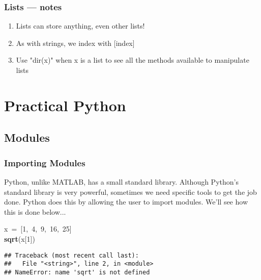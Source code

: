 \documentclass{beamer}\usepackage[]{graphicx}\usepackage[]{color}
\makeatletter
\newcommand{\hlnum}[1]{\textcolor[rgb]{0.686,0.059,0.569}{#1}}%
\newcommand{\hlopt}[1]{\textcolor[rgb]{0,0,0}{#1}}%
\newcommand{\hlstd}[1]{\textcolor[rgb]{0.345,0.345,0.345}{#1}}%
\newcommand{\hlkwd}[1]{\textcolor[rgb]{0.737,0.353,0.396}{\textbf{#1}}}%
\newenvironment{kframe}{%
 \def\at@end@of@kframe{}%
 \ifinner\ifhmode%
  \def\at@end@of@kframe{\end{minipage}}%
  \begin{minipage}{\columnwidth}%
 \fi\fi%
 \def\FrameCommand##1{\hskip\@totalleftmargin \hskip-\fboxsep
 \colorbox{shadecolor}{##1}\hskip-\fboxsep
     \hskip-\linewidth \hskip-\@totalleftmargin \hskip\columnwidth}%
 \MakeFramed {\advance\hsize-\width
   \@totalleftmargin\z@ \linewidth\hsize
   \@setminipage}}%
 {\par\unskip\endMakeFramed%
 \at@end@of@kframe}
\newenvironment{knitrout}{}{} %
\makeatother
\begin{document}
\begin{frame}[fragile]
\frametitle{Lists --- notes}
\begin{enumerate}
	\item Lists can store anything, even other lists!

	\item As with strings, we index with [index]

	\item Use "dir(x)" when x is a list to see all the methods available to manipulate lists 
\end{enumerate}
\end{frame}

\section{Practical Python}

\subsection{Modules}

\begin{frame}[fragile]
\frametitle{Importing Modules}

Python, unlike MATLAB, has a small standard library. Although Python's standard library is very powerful, sometimes we need specific tools to get the job done. Python does this by allowing the user to import modules. We'll see how this is done below...

\begin{knitrout}
\color{fgcolor}\begin{kframe}
\noindent
\ttfamily
\hlstd{x\ }\hlopt{=\ {[}}\hlstd{}\hlnum{1}\hlstd{}\hlopt{,\ }\hlstd{}\hlnum{4}\hlstd{}\hlopt{,\ }\hlstd{}\hlnum{9}\hlstd{}\hlopt{,\ }\hlstd{}\hlnum{16}\hlstd{}\hlopt{,\ }\hlstd{}\hlnum{25}\hlstd{}\hlopt{{]}}\hspace*{\fill}\\
\hlstd{}\hlkwd{sqrt}\hlstd{}\hlopt{(}\hlstd{x}\hlopt{{[}}\hlstd{}\hlnum{1}\hlstd{}\hlopt{{]})}\hlstd{}\hspace*{\fill}
\mbox{}
\normalfont

\begin{verbatim}
## Traceback (most recent call last):
##   File "<string>", line 2, in <module>
## NameError: name 'sqrt' is not defined
\end{verbatim}
\end{kframe}
\end{knitrout}
\end{frame}
\end{document}
